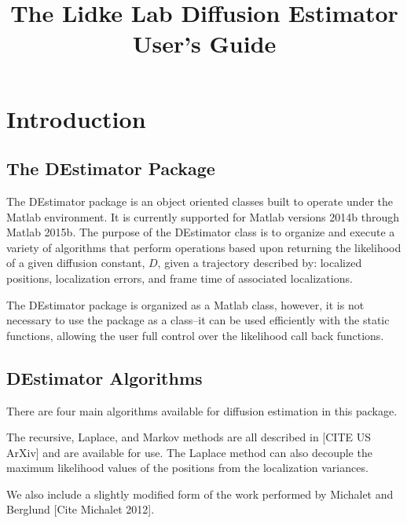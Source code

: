 \documentclass{article}
\begin{document}
\title{The Lidke Lab Diffusion Estimator User's Guide}

\maketitle

\tableofcontents

\section{Introduction}

\subsection{The DEstimator Package}
The DEstimator package is an object oriented classes built to operate under the Matlab environment.  It is currently supported for Matlab versions 2014b through Matlab 2015b.  The purpose of the DEstimator class is to organize and execute a variety of algorithms that perform operations based upon returning the likelihood of a given diffusion constant, $D$, given a trajectory described by: localized positions, localization errors, and frame time of associated localizations.

The DEstimator package is organized as a Matlab class, however, it is not necessary to use the package as a class--it can be used efficiently with the static functions, allowing the user full control over the likelihood call back functions.

\subsection{DEstimator Algorithms}
There are four main algorithms available for diffusion estimation in this package.

The recursive, Laplace, and Markov methods are all described in [CITE US ArXiv] and are available for use.  The Laplace method can also decouple the maximum likelihood values of the positions from the localization variances.

We also include a slightly modified form of the work performed by Michalet and Berglund [Cite Michalet 2012].
\end{document}
